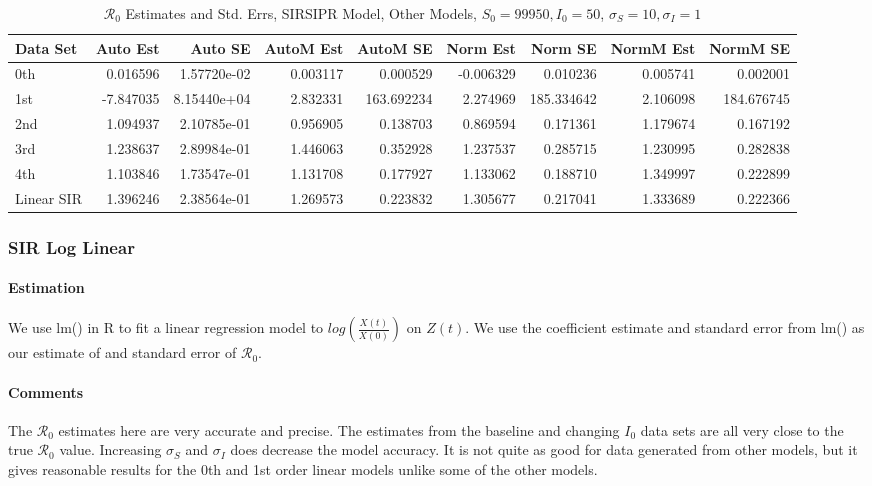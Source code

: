 \documentclass[12pt]{article}
\newcommand{\rr}{\ensuremath{\mathcal{R}_0}}
\begin{document}
\begin{table}[H]
	
	\caption{$\rr$ Estimates and Std. Errs, SIRSIPR Model,
		Other Models, $S_0 = 99950, I_0 = 50$, 
		$\sigma_S = 10, \sigma_I = 1$}
	\begin{footnotesize}
		\hskip -1cm
	\begin{tabular}{l|r|r|r|r|r|r|r|r}
		\hline
		Data Set & Auto Est & Auto SE & AutoM Est & AutoM SE & Norm Est & Norm SE & NormM Est & NormM SE\\
		\hline
		0th & 0.016596 & 1.57720e-02 & 0.003117 & 0.000529 & -0.006329 & 0.010236 & 0.005741 & 0.002001\\
		\hline
		1st & -7.847035 & 8.15440e+04 & 2.832331 & 163.692234 & 2.274969 & 185.334642 & 2.106098 & 184.676745\\
		\hline
		2nd & 1.094937 & 2.10785e-01 & 0.956905 & 0.138703 & 0.869594 & 0.171361 & 1.179674 & 0.167192\\
		\hline
		3rd & 1.238637 & 2.89984e-01 & 1.446063 & 0.352928 & 1.237537 & 0.285715 & 1.230995 & 0.282838\\
		\hline
		4th & 1.103846 & 1.73547e-01 & 1.131708 & 0.177927 & 1.133062 & 0.188710 & 1.349997 & 0.222899\\
		\hline
		Linear SIR & 1.396246 & 2.38564e-01 & 1.269573 & 0.223832 & 1.305677 & 0.217041 & 1.333689 & 0.222366\\
		\hline
	\end{tabular}
\end{footnotesize}
\end{table}

\subsubsection{SIR Log Linear}

\paragraph{Estimation}

We use lm() in R to fit a linear regression model to $log(\frac{X(t)}{X(0)})$ on $Z(t)$. We use the coefficient estimate and standard error from lm() as our estimate of and standard error of $\rr$.

\paragraph{Comments}

The $\rr$ estimates here are very accurate and precise. The estimates from the baseline and changing $I_0$ data sets are all very close to the true $\rr$ value. Increasing $\sigma_S$ and $\sigma_I$ does decrease the model accuracy. It is not quite as good for data generated from other models, but it gives reasonable results for the 0th and 1st order linear models unlike some of the other models.
\end{document}
